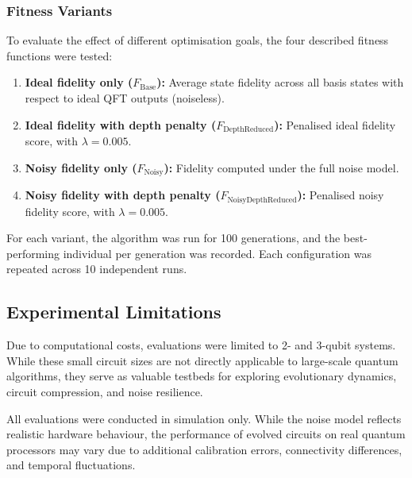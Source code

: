 \documentclass[11pt,a4paper]{article}
\begin{document}
\subsubsection*{Fitness Variants}
To evaluate the effect of different optimisation goals, the four described fitness functions were tested:

\begin{enumerate}
    \item \textbf{Ideal fidelity only ($F_{\text{Base}}$):} Average state fidelity across all basis states with respect to ideal QFT outputs (noiseless).
    
    \item \textbf{Ideal fidelity with depth penalty ($F_\text{DepthReduced}$):} Penalised ideal fidelity score, with $\lambda = 0.005$.
    
    \item \textbf{Noisy fidelity only ($F_{\text{Noisy}}$):} Fidelity computed under the full noise model.
    
    \item \textbf{Noisy fidelity with depth penalty ($F_{\text{NoisyDepthReduced}}$):} Penalised noisy fidelity score, with $\lambda = 0.005$.
\end{enumerate}

For each variant, the algorithm was run for 100 generations, and the best-performing individual per generation was recorded. Each configuration was repeated across 10 independent runs.

\subsection{Experimental Limitations}
Due to computational costs, evaluations were limited to 2- and 3-qubit systems. While these small circuit sizes are not directly applicable to large-scale quantum algorithms, they serve as valuable testbeds for exploring evolutionary dynamics, circuit compression, and noise resilience.\newline

All evaluations were conducted in simulation only. While the noise model reflects realistic hardware behaviour, the performance of evolved circuits on real quantum processors may vary due to additional calibration errors, connectivity differences, and temporal fluctuations.


%
%
\end{document}
